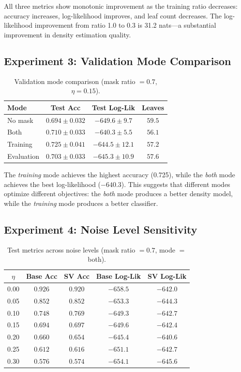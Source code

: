 \documentclass[11pt,a4paper]{article}
\begin{document}
All three metrics show monotonic improvement as the training ratio decreases:
accuracy increases, log-likelihood improves, and leaf count decreases. The
log-likelihood improvement from ratio 1.0 to 0.3 is 31.2 nats---a substantial
improvement in density estimation quality.

\subsection{Experiment 3: Validation Mode Comparison}

\begin{table}[h]
\centering
\caption{Validation mode comparison (mask ratio $= 0.7$, $\eta = 0.15$).}
\label{tab:exp3}
\begin{tabular}{lccc}
\toprule
Mode & Test Acc & Test Log-Lik & Leaves \\
\midrule
No mask     & $0.694 \pm 0.032$ & $-649.6 \pm 9.7$ & $59.5$ \\
Both        & $0.710 \pm 0.033$ & $\mathbf{-640.3 \pm 5.5}$ & $\mathbf{56.1}$ \\
Training    & $\mathbf{0.725 \pm 0.041}$ & $-644.5 \pm 12.1$ & $57.2$ \\
Evaluation  & $0.703 \pm 0.033$ & $-645.3 \pm 10.9$ & $57.6$ \\
\bottomrule
\end{tabular}
\end{table}

The \emph{training} mode achieves the highest accuracy (0.725), while the
\emph{both} mode achieves the best log-likelihood ($-640.3$). This suggests
that different modes optimize different objectives: the \emph{both} mode
produces a better density model, while the \emph{training} mode produces a
better classifier.

\subsection{Experiment 4: Noise Level Sensitivity}

\begin{table}[h]
\centering
\caption{Test metrics across noise levels (mask ratio $= 0.7$, mode $=$ both).}
\label{tab:exp4}
\begin{tabular}{ccccc}
\toprule
$\eta$ & Base Acc & SV Acc & Base Log-Lik & SV Log-Lik \\
\midrule
0.00 & $0.926$ & $0.920$ & $-658.5$ & $\mathbf{-642.0}$ \\
0.05 & $0.852$ & $0.852$ & $-653.3$ & $\mathbf{-644.3}$ \\
0.10 & $0.748$ & $\mathbf{0.769}$ & $-649.3$ & $\mathbf{-642.7}$ \\
0.15 & $0.694$ & $0.697$ & $-649.6$ & $\mathbf{-642.4}$ \\
0.20 & $0.660$ & $0.654$ & $-645.4$ & $\mathbf{-640.6}$ \\
0.25 & $0.612$ & $0.616$ & $-651.1$ & $\mathbf{-642.7}$ \\
0.30 & $0.576$ & $0.574$ & $-654.1$ & $\mathbf{-645.6}$ \\
\bottomrule
\end{tabular}
\end{table}
\end{document}
